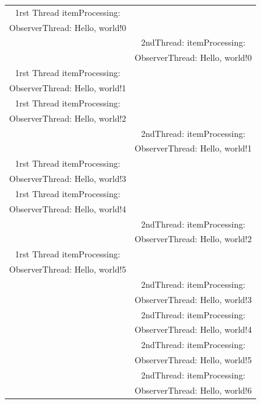 \documentclass[12pt,oneside,a4paper,bibtotoc,liststotoc]{scrreprt}
\begin{document}
\begin{table}[h!]
  \begin{center}
    \label{tab:table2}
    \begin{tabular}{cc}
\midrule

1rst Thread itemProcessing:&  \\
ObserverThread: Hello, world!0&  \\
              	  					&  2ndThread: itemProcessing:\\
             						 &  ObserverThread: Hello, world!0\\
1rst Thread itemProcessing:&  \\
ObserverThread: Hello, world!1&  \\
1rst Thread itemProcessing:&  \\
ObserverThread: Hello, world!2&  \\
                               		& 2ndThread: itemProcessing:\\
                              		& ObserverThread: Hello, world!1\\
1rst Thread itemProcessing:&  \\
ObserverThread: Hello, world!3&  \\
1rst Thread itemProcessing:&  \\
ObserverThread: Hello, world!4&  \\
                            		& 2ndThread: itemProcessing:\\
                               		& ObserverThread: Hello, world!2\\
1rst Thread itemProcessing:&  \\
ObserverThread: Hello, world!5&  \\
                          	   		& 2ndThread: itemProcessing:\\
                               		& ObserverThread: Hello, world!3\\
                               		& 2ndThread: itemProcessing:\\
                               		& ObserverThread: Hello, world!4\\
                               		& 2ndThread: itemProcessing:\\
                               		& ObserverThread: Hello, world!5\\
                               		& 2ndThread: itemProcessing:\\
                               		& ObserverThread: Hello, world!6\\

\end{tabular}
\end{center}
\end{table}
\end{document}
